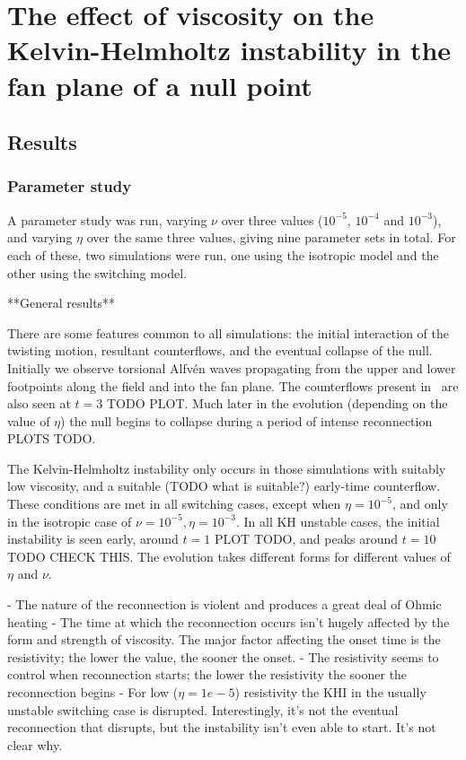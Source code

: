 \chapter{The effect of viscosity on the Kelvin-Helmholtz instability in the fan plane of a null point}

\section{Results}

\subsection{Parameter study}

A parameter study was run, varying $\nu$ over three values ($10^{-5}$, $10^{-4}$ and $10^{-3}$), and varying $\eta$ over the same three values, giving nine parameter sets in total. For each of these, two simulations were run, one using the isotropic model and the other using the switching model.

**General results**

There are some features common to all simulations: the initial interaction of the twisting motion, resultant counterflows, and the eventual collapse of the null. Initially we observe torsional Alfv\'en waves propagating from the upper and lower footpoints along the field and into the fan plane. The counterflows present in~\cite{wyperKelvinHelmholtzInstabilityCurrentvortex2013} are also seen at $t=3$ TODO PLOT. Much later in the evolution (depending on the value of $\eta$) the null begins to collapse during a period of intense reconnection PLOTS TODO.

The Kelvin-Helmholtz instability only occurs in those simulations with suitably low viscosity, and a suitable (TODO what is suitable?) early-time counterflow. These conditions are met in all switching cases, except when $\eta=10^{-5}$, and only in the isotropic case of $\nu = 10^{-5}, \eta=10^{-3}$. In all KH unstable cases, the initial instability is seen early, around $t=1$ PLOT TODO, and peaks around $t=10$ TODO CHECK THIS. The evolution takes different forms for different values of $\eta$ and $\nu$.

- The nature of the reconnection is violent and produces a great deal of Ohmic heating
- The time at which the reconnection occurs isn't hugely affected by the form and strength of viscosity. The major factor affecting the onset time is the resistivity; the lower the value, the sooner the onset.
- The resistivity seems to control when reconnection starts; the lower the resistivity the sooner the reconnection begins
- For low ($\eta=1e-5$) resistivity the KHI in the usually unstable switching case is disrupted. Interestingly, it's not the eventual reconnection that disrupts, but the instability isn't even able to start. It's not clear why.
